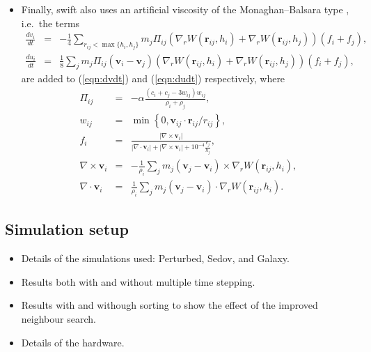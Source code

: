 \documentclass[final]{siamltex}
\newcommand{\eqn}[1]
    {(\ref{eqn:#1})}
\newcommand{\swift}
    {{\sc swift}\xspace}
\begin{document}
\begin{itemize}
    \item Finally, \swift also uses an artificial viscosity of the
        Monaghan--Balsara type \cite{ref:Monaghan1983,ref:Balsara1995},
        i.e.~the terms
        \begin{eqnarray*}
            \frac{dv_i}{dt} & = & -\frac{1}{4}\sum_{r_{ij} < \max\{h_i,h_j\}} m_j \Pi_{ij} \left({\nabla_r}W(\mathbf{r}_{ij},
            h_i)+{\nabla_r}W(\mathbf{r}_{ij}, h_j)\right) (f_i+f_j),\\
            \frac{du_i}{dt} & = & \frac{1}{8} \sum_j m_j \Pi_{ij}(\mathbf{v}_i - \mathbf{v}_j)
            \left({\nabla_r}W(\mathbf{r}_{ij},
            h_i)+{\nabla_r}W(\mathbf{r}_{ij}, h_j)\right) (f_i+f_j),
        \end{eqnarray*}
        are added to \eqn{dvdt} and \eqn{dudt} respectively, where
        \begin{eqnarray*}
            \Pi_{ij} &=& -\alpha \frac{\left(c_i + c_j - 3w_{ij}\right)w_{ij}}{\rho_i + \rho_j}, \\
            w_{ij} &=& \min\left\{0, \mathbf{v}_{ij}\cdot\mathbf{r}_{ij} / r_{ij}\right\}, \\
            f_i &=& \frac{|\nabla \times \mathbf{v}_i|}{|\nabla \cdot \mathbf{v}_i| + |\nabla \times \mathbf{v}_i| +
            10^{-4}\frac{c_j}{h_j}}, \\
            \nabla \times \mathbf{v}_i &=& -\frac{1}{\rho_i}\sum_j m_j (\mathbf{v}_j - \mathbf{v}_i)\times
            {\nabla_r}W(\mathbf{r}_{ij}, h_i), \\
            \nabla \cdot \mathbf{v}_i &=& \frac{1}{\rho_i}\sum_j m_j (\mathbf{v}_j - \mathbf{v}_i)\cdot {\nabla_r}W(\mathbf{r}_{ij},
            h_i).
        \end{eqnarray*}
    
\end{itemize}


\subsection{Simulation setup}

\begin{itemize}

    \item Details of the simulations used: Perturbed, Sedov, and Galaxy.
        
    \item Results both with and without multiple time stepping.
    
    \item Results with and withough sorting to show the effect of the
        improved neighbour search.
        
    \item Details of the hardware.
        
\end{itemize}
\end{document}

